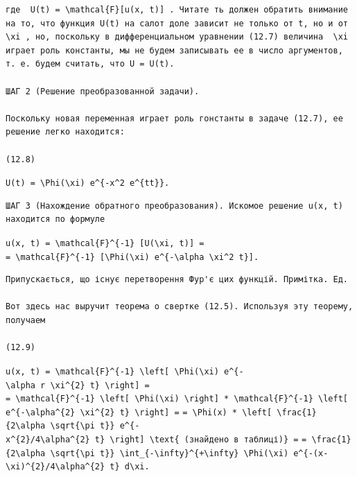 \documentclass[
  ukrainian,
]{article}
\begin{document}
\begin{verbatim}
где  U(t) = \mathcal{F}[u(x, t)] . Читате ть должен обратить внимание на то, что функция U(t) на салот доле зависит не только от t, но и от  \xi , но, поскольку в дифференциальном уравнении (12.7) величина  \xi  играет роль константы, мы не будем записывать ее в число аргументов, т. е. будем считать, что U = U(t).

ШАГ 2 (Решение преобразованной задачи).

Поскольку новая переменная играет роль гонстанты в задаче (12.7), ее решение легко находится:

(12.8)
\end{verbatim}

\texttt{U(t)\ =\ \textbackslash{}Phi(\textbackslash{}xi)\ e\^{}\{-x\^{}2\ e\^{}\{tt\}\}.}

\begin{verbatim}
ШАГ 3 (Нахождение обратного преобразования). Искомое решение u(x, t) находится по формуле
\end{verbatim}

\texttt{u(x,\ t)\ =\ \textbackslash{}mathcal\{F\}\^{}\{-1\}\ {[}U(\textbackslash{}xi,\ t){]}\ =}
\texttt{=\ \textbackslash{}mathcal\{F\}\^{}\{-1\}\ {[}\textbackslash{}Phi(\textbackslash{}xi)\ e\^{}\{-\textbackslash{}alpha\ \textbackslash{}xi\^{}2\ t\}{]}.}

\begin{verbatim}
Припускається, що існує перетворення Фур'є цих функцій. Примітка. Ед.

Вот здесь нас выручит теорема о свертке (12.5). Используя эту теорему, получаем

(12.9)
\end{verbatim}

\texttt{u(x,\ t)\ =\ \textbackslash{}mathcal\{F\}\^{}\{-1\}\ \textbackslash{}left{[}\ \textbackslash{}Phi(\textbackslash{}xi)\ e\^{}\{-\textbackslash{}alpha\ r\ \textbackslash{}xi\^{}\{2\}\ t\}\ \textbackslash{}right{]}\ =}
\texttt{=\ \textbackslash{}mathcal\{F\}\^{}\{-1\}\ \textbackslash{}left{[}\ \textbackslash{}Phi(\textbackslash{}xi)\ \textbackslash{}right{]}\ *\ \textbackslash{}mathcal\{F\}\^{}\{-1\}\ \textbackslash{}left{[}\ e\^{}\{-\textbackslash{}alpha\^{}\{2\}\ \textbackslash{}xi\^{}\{2\}\ t\}\ \textbackslash{}right{]}\ =}
\texttt{=\ \textbackslash{}Phi(x)\ *\ \textbackslash{}left{[}\ \textbackslash{}frac\{1\}\{2\textbackslash{}alpha\ \textbackslash{}sqrt\{\textbackslash{}pi\ t\}\}\ e\^{}\{-x\^{}\{2\}/4\textbackslash{}alpha\^{}\{2\}\ t\}\ \textbackslash{}right{]}\ \textbackslash{}text\{\ (знайдено\ в\ таблиці)\}\ =}
\texttt{=\ \textbackslash{}frac\{1\}\{2\textbackslash{}alpha\ \textbackslash{}sqrt\{\textbackslash{}pi\ t\}\}\ \textbackslash{}int\_\{-\textbackslash{}infty\}\^{}\{+\textbackslash{}infty\}\ \textbackslash{}Phi(\textbackslash{}xi)\ e\^{}\{-(x-\textbackslash{}xi)\^{}\{2\}/4\textbackslash{}alpha\^{}\{2\}\ t\}\ d\textbackslash{}xi.}
\end{document}
